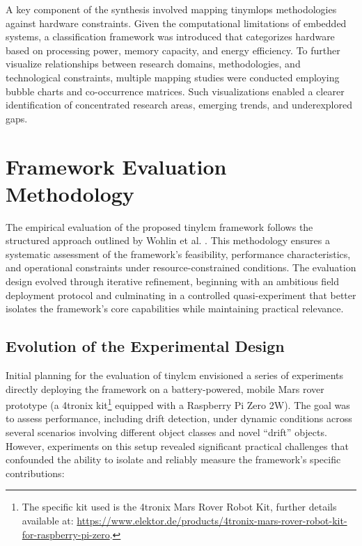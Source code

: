 A key component of the synthesis involved mapping \gls{tinymlops} methodologies against hardware constraints. Given the computational limitations of embedded systems, a classification framework was introduced that categorizes hardware based on processing power, memory capacity, and energy efficiency. To further visualize relationships between research domains, methodologies, and technological constraints, multiple mapping studies were conducted employing bubble charts and co-occurrence matrices. Such visualizations enabled a clearer identification of concentrated research areas, emerging trends, and underexplored gaps.

\section{Framework Evaluation Methodology}
\label{sec:FrameworkEvaluationMethodology}

The empirical evaluation of the proposed \gls{tinylcm} framework follows the structured approach outlined by Wohlin et al. \cite{wohlinExperimentationSoftwareEngineering2024}. This methodology ensures a systematic assessment of the framework's feasibility, performance characteristics, and operational constraints under resource-constrained conditions. The evaluation design evolved through iterative refinement, beginning with an ambitious field deployment protocol and culminating in a controlled quasi-experiment that better isolates the framework's core capabilities while maintaining practical relevance.

\subsection{Evolution of the Experimental Design}
\label{ssec:experimental_design_evolution}

Initial planning for the evaluation of \gls{tinylcm} envisioned a series of experiments directly deploying the framework on a battery-powered, mobile Mars rover prototype (a 4tronix kit\footnote{The specific kit used is the 4tronix Mars Rover Robot Kit, further details available at: \url{https://www.elektor.de/products/4tronix-mars-rover-robot-kit-for-raspberry-pi-zero}.} equipped with a Raspberry Pi Zero 2W). The goal was to assess performance, including drift detection, under dynamic conditions across several scenarios involving different object classes and novel ``drift'' objects. However, experiments on this setup revealed significant practical challenges that confounded the ability to isolate and reliably measure the framework's specific contributions:

